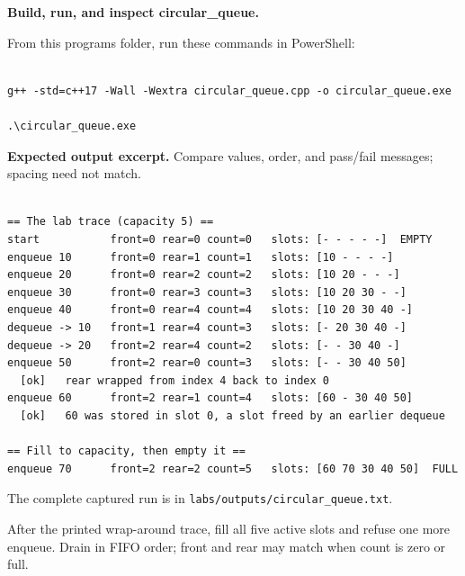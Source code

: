 \tcbbreak

\textbf{Build, run, and inspect circular\_queue.}

From this program\textquotesingle s folder, run these commands in PowerShell:

\begin{lstlisting}[style=utpterminal,language={}]

g++ -std=c++17 -Wall -Wextra circular_queue.cpp -o circular_queue.exe

.\circular_queue.exe

\end{lstlisting}

\textbf{Expected output excerpt.} Compare values, order, and pass/fail messages; spacing need not match.

\begin{lstlisting}[style=utpterminal,language={}]

== The lab trace (capacity 5) ==
start           front=0 rear=0 count=0   slots: [- - - - -]  EMPTY
enqueue 10      front=0 rear=1 count=1   slots: [10 - - - -]
enqueue 20      front=0 rear=2 count=2   slots: [10 20 - - -]
enqueue 30      front=0 rear=3 count=3   slots: [10 20 30 - -]
enqueue 40      front=0 rear=4 count=4   slots: [10 20 30 40 -]
dequeue -> 10   front=1 rear=4 count=3   slots: [- 20 30 40 -]
dequeue -> 20   front=2 rear=4 count=2   slots: [- - 30 40 -]
enqueue 50      front=2 rear=0 count=3   slots: [- - 30 40 50]
  [ok]   rear wrapped from index 4 back to index 0
enqueue 60      front=2 rear=1 count=4   slots: [60 - 30 40 50]
  [ok]   60 was stored in slot 0, a slot freed by an earlier dequeue

== Fill to capacity, then empty it ==
enqueue 70      front=2 rear=2 count=5   slots: [60 70 30 40 50]  FULL

\end{lstlisting}

The complete captured run is in \texttt{labs/outputs/circular\_queue.txt}.

\begin{tryit}

After the printed wrap-around trace, fill all five active slots and refuse one more enqueue. Drain in FIFO order; front and rear may match when count is zero or full.

\end{tryit}
